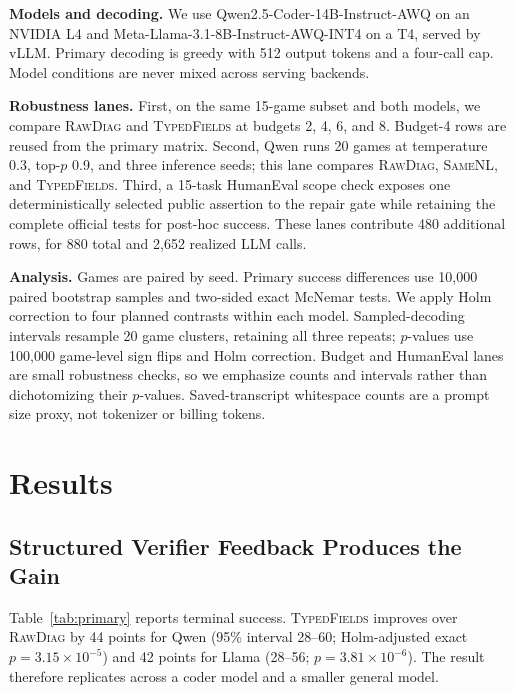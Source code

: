 \documentclass[sigconf,review,anonymous]{acmart}
\newcommand{\rawdiag}{\textsc{RawDiag}\xspace}
\newcommand{\samenl}{\textsc{SameNL}\xspace}
\newcommand{\typedfields}{\textsc{TypedFields}\xspace}
\begin{document}
\textbf{Models and decoding.} We use Qwen2.5-Coder-14B-Instruct-AWQ
\cite{hui2024qwen25coder} on an NVIDIA L4 and
Meta-Llama-3.1-8B-Instruct-AWQ-INT4
\cite{grattafiori2024llama3} on a T4, served by vLLM. Primary decoding is greedy with
512 output tokens and a four-call cap. Model conditions are never mixed across
serving backends.

\textbf{Robustness lanes.} First, on the same 15-game subset and both models,
we compare \rawdiag and \typedfields at budgets 2, 4, 6, and 8. Budget-4 rows
are reused from the primary matrix. Second, Qwen runs 20 games at temperature
0.3, top-$p$ 0.9, and three inference seeds; this lane compares \rawdiag,
\samenl, and \typedfields. Third, a 15-task HumanEval scope check exposes one
deterministically selected public assertion to the repair gate while retaining
the complete official tests for post-hoc success. These lanes contribute 480
additional rows, for 880 total and 2,652 realized LLM calls.

\textbf{Analysis.} Games are paired by seed. Primary success differences use
10,000 paired bootstrap samples and two-sided exact McNemar tests. We apply Holm
correction to four planned contrasts within each model. Sampled-decoding
intervals resample 20 game clusters, retaining all three repeats; $p$-values use
100,000 game-level sign flips and Holm correction. Budget and HumanEval lanes
are small robustness checks, so we emphasize counts and intervals rather than
dichotomizing their $p$-values. Saved-transcript whitespace counts are a prompt
size proxy, not tokenizer or billing tokens.

\section{Results}

\subsection{Structured Verifier Feedback Produces the Gain}

Table~\ref{tab:primary} reports terminal success. \typedfields improves over
\rawdiag by 44 points for Qwen (95\% interval 28--60; Holm-adjusted exact
$p=3.15\times10^{-5}$) and 42 points for Llama (28--56;
$p=3.81\times10^{-6}$). The result therefore replicates across a coder model
and a smaller general model.
\end{document}
